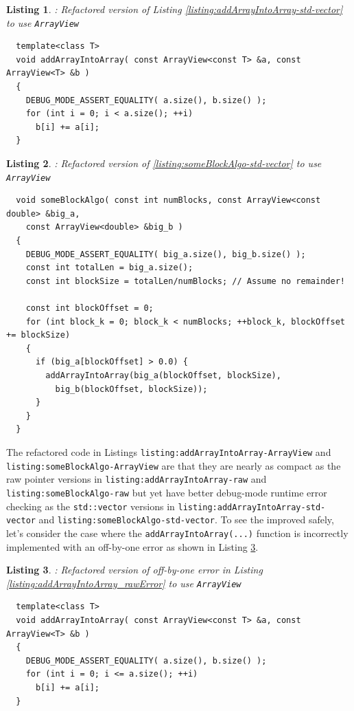 \documentclass[pdf,ps2pdf,11pt]{SANDreport}
\newtheorem{listing}{Listing}
\begin{document}
\begin{listing}: Refactored version of Listing
  {}\ref{listing:addArrayIntoArray-std-vector} to use {}\texttt{ArrayView} \\
\label{listing:addArrayIntoArray-ArrayView}
{\small\begin{verbatim}
  template<class T>
  void addArrayIntoArray( const ArrayView<const T> &a, const ArrayView<T> &b )
  {
    DEBUG_MODE_ASSERT_EQUALITY( a.size(), b.size() );
    for (int i = 0; i < a.size(); ++i)
      b[i] += a[i];
  }
\end{verbatim}}
\end{listing}

\begin{listing}: Refactored version of
  {}\ref{listing:someBlockAlgo-std-vector} to use {}\texttt{ArrayView} \\
\label{listing:someBlockAlgo-ArrayView}
{\small\begin{verbatim}
  void someBlockAlgo( const int numBlocks, const ArrayView<const double> &big_a,
    const ArrayView<double> &big_b )
  {
    DEBUG_MODE_ASSERT_EQUALITY( big_a.size(), big_b.size() );
    const int totalLen = big_a.size();
    const int blockSize = totalLen/numBlocks; // Assume no remainder!
    
    const int blockOffset = 0;
    for (int block_k = 0; block_k < numBlocks; ++block_k, blockOffset += blockSize)
    {
      if (big_a[blockOffset] > 0.0) {
        addArrayIntoArray(big_a(blockOffset, blockSize),
          big_b(blockOffset, blockSize));
      }
    }
  }
\end{verbatim}}
\end{listing}

The refactored code in Listings
{}\texttt{listing:addArrayIntoArray-ArrayView} and
{}\texttt{listing:someBlockAlgo-ArrayView} are that they are nearly as
compact as the raw pointer versions in
{}\texttt{listing:addArrayIntoArray-raw} and
{}\texttt{listing:someBlockAlgo-raw} but yet have better debug-mode
runtime error checking as the {}\texttt{std::vector} versions in
{}\texttt{listing:addArrayIntoArray-std-vector} and
{}\texttt{listing:someBlockAlgo-std-vector}.  To see the improved
safely, let's consider the case where the
{}\texttt{addArrayIntoArray(...)} function is incorrectly implemented
with an off-by-one error as shown in Listing
{}\ref{listing:addArrayIntoArray-ArrayViewError}.

\begin{listing}: Refactored version of off-by-one error in Listing
  {}\ref{listing:addArrayIntoArray_rawError} to use {}\texttt{ArrayView} \\
\label{listing:addArrayIntoArray-ArrayViewError}
{\small\begin{verbatim}
  template<class T>
  void addArrayIntoArray( const ArrayView<const T> &a, const ArrayView<T> &b )
  {
    DEBUG_MODE_ASSERT_EQUALITY( a.size(), b.size() );
    for (int i = 0; i <= a.size(); ++i)
      b[i] += a[i];
  }
\end{verbatim}}
\end{listing}
\end{document}
